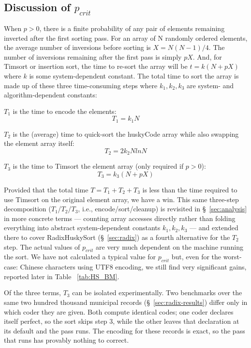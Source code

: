 \documentclass[twoside,leqno,twocolumn]{article}
\begin{document}
\subsection{Discussion of \texorpdfstring{$p_{crit}$}{p\_crit}}
\label{sec:pcrit}
When $p > 0$, there is a finite probability of any pair of elements remaining inverted after the first sorting pass.
For an array of N randomly ordered elements, the average number of inversions before sorting is $X = N (N -1 ) / 4$.
The number of inversions remaining after the first pass is simply $p X$.
And, for Timsort or insertion sort, the time to re-sort the array will be $t = k (N + p X)$ where $k$ is some system-dependent constant.
The total time to sort the array is made up of these three time-consuming steps where $k_1, k_2, k_3$ are system- and algorithm-dependent constants:

\begin{steps}
 \item{} $T_1$ is the time to encode the elements:
\[T_1 = k_1 N\]
\item{}  $T_2$ is the (average) time to quick-sort the huskyCode array while also swapping the element array itself:
\[T_2 = 2 k_2 N ln N\]
\item{}  $T_3$  is the time to Timsort the element array (only required if $p>0$):
 \[T_3 = k_3 (N + p X)\]
\end{steps}
Provided that the total time $T = T_1 + T_2 + T_3$ is less than the time required to use Timsort on the original element array, we have a win.
This same three-step decomposition ($T_1$/$T_2$/$T_3$, i.e., encode/sort/cleanup) is revisited in \S~\ref{sec:analysis}
in more concrete terms —
counting array accesses directly rather than folding everything into abstract system-dependent constants $k_1, k_2, k_3$ —
and extended there to cover RadixHuskySort (\S~\ref{sec:radix}) as a fourth alternative for the $T_2$ step.
The actual values of $p_{crit}$ are very much dependent on the machine running the sort.
We have not calculated a typical value for $p_{crit}$ but, even for the worst-case:
Chinese characters using UTF8 encoding, we still find very significant gains, reported later in Table ~\ref{tab:HS_BM}.

Of the three terms, $T_3$ can be isolated experimentally.
Two benchmarks over the same two hundred thousand municipal records (\S~\ref{sec:radix-results})
differ only in which coder they are given.
Both compute identical codes; one coder declares itself perfect, so the sort skips step 3,
while the other leaves that declaration at its default and the pass runs.
The encoding for these records is exact, so the pass that runs has provably nothing to correct.
\end{document}
